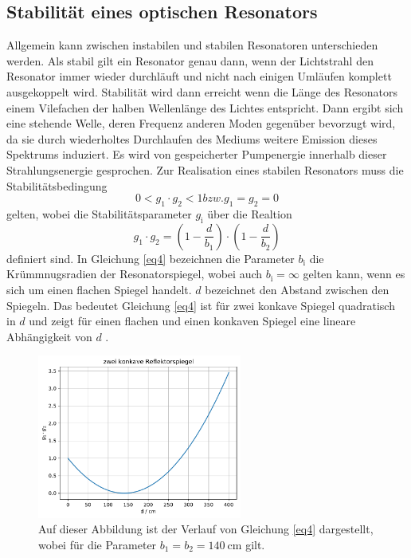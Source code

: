 \subsection{Stabilität eines optischen Resonators}

Allgemein kann zwischen instabilen und stabilen Resonatoren unterschieden werden.
Als stabil gilt ein Resonator genau dann, wenn der Lichtstrahl den Resonator immer
wieder durchläuft und nicht nach einigen Umläufen komplett ausgekoppelt wird.
Stabilität wird dann erreicht wenn die Länge des Resonators einem Vilefachen der 
halben Wellenlänge des Lichtes entspricht. Dann ergibt sich eine stehende Welle,
deren Frequenz anderen Moden gegenüber bevorzugt wird, da sie durch wiederholtes 
Durchlaufen des Mediums weitere Emission dieses Spektrums induziert.
Es wird von gespeicherter Pumpenergie innerhalb dieser Strahlungsenergie gesprochen.
Zur Realisation eines stabilen Resonators muss die Stabilitätsbedingung 
\begin{equation}
    0 < g_1 \cdot g_2 <1 bzw. g_1 = g_2 = 0
    \label{eq3}
\end{equation}
gelten, wobei die Stabilitätsparameter $g_{\text{i}}$ über die Realtion 
\begin{equation}
    g_1 \cdot g_2  = \left( 1- \frac{d}{b_1} \right) \cdot \left(1 - \frac{d}{b_2} \right)
    \label{eq4}
\end{equation}
definiert sind. In Gleichung \eqref{eq4} bezeichnen die Parameter $b_{\text{i}}$ die 
Krümmnugsradien der Resonatorspiegel, wobei auch $b_{\text{i}} = \infty$ gelten kann, 
wenn es sich um einen flachen Spiegel handelt.
$d$ bezeichnet den Abstand zwischen den Spiegeln. 
Das bedeutet Gleichung \eqref{eq4} ist für zwei konkave Spiegel quadratisch in $d$ und 
zeigt für einen flachen und einen konkaven Spiegel eine lineare Abhängigkeit von $d$ \cite{1}.
\begin{figure}
    \centering
    \includegraphics[width=0.6\textwidth]{figure/d_quad.pdf}
    \caption{Auf dieser Abbildung ist der Verlauf von Gleichung \eqref{eq4} 
    dargestellt, wobei für die Parameter $b_{1}=b_{2} = \SI{140}{\centi\meter}$ gilt.}
    \label{abb1}
\end{figure}

